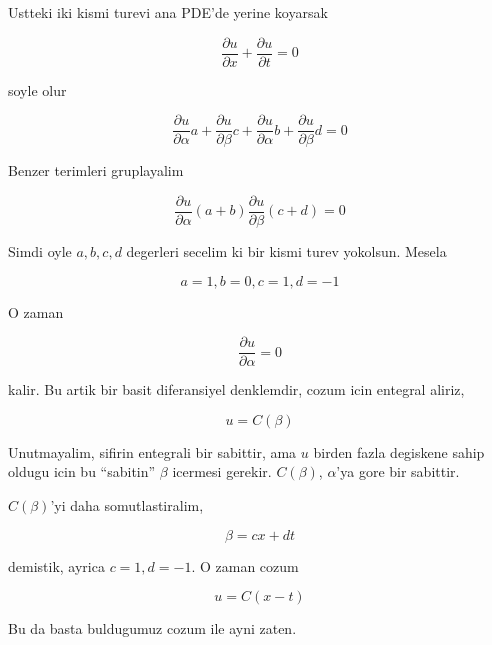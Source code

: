 \documentclass[12pt,fleqn]{article}\usepackage{../common}
\begin{document}
Ustteki iki kismi turevi ana PDE'de yerine koyarsak

\[ \frac{\partial u}{\partial x} + \frac{\partial u}{\partial t} = 0\]

soyle olur

\[ 
\frac{\partial u}{\partial \alpha} a  +
\frac{\partial u}{\partial \beta} c + 
\frac{\partial u}{\partial \alpha} b + 
\frac{\partial u}{\partial \beta} d = 0
\]

Benzer terimleri gruplayalim

\[ 
\frac{\partial u}{\partial \alpha} (a+b)
\frac{\partial u}{\partial \beta} (c+d) = 0
\]

Simdi oyle $a,b,c,d$ degerleri secelim ki bir kismi turev yokolsun. Mesela 

\[ a = 1, b = 0, c=1, d=-1 \]


O zaman 

\[ \frac{\partial u}{\partial \alpha} = 0 \]

kalir. Bu artik bir basit diferansiyel denklemdir, cozum icin entegral
aliriz, 

\[ u = C(\beta) \]

Unutmayalim, sifirin entegrali bir sabittir, ama $u$ birden fazla degiskene
sahip oldugu icin bu ``sabitin'' $\beta$ icermesi gerekir. $C(\beta)$,
$\alpha$'ya gore bir sabittir. 

$C(\beta)$'yi daha somutlastiralim, 

\[ \beta = cx + dt \]
 
demistik, ayrica $c=1,d=-1$. O zaman cozum

\[ u = C(x-t) \]

Bu da basta buldugumuz cozum ile ayni zaten. 
\end{document}
